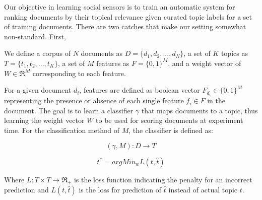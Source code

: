 

Our objective in learning social sensors is to train an automatic
system for ranking documents by their topical relevance given curated
topic labels for a set of training documents.  There are two catches
that make our setting somewhat non-standard.  First, 

We define a corpus of $N$ documents as $D = \{{d_{1}}, {d_{2}}, ..., {d_{N}} \}$, a set of $K$ topics as $T = \{{t_{1}}, {t_{2}}, ..., {t_{K}} \}$, a set of $M$ features as $F = \{0,1\}^{M}$, and a weight vector of $W \in \Re^{M}$ corresponding to each feature. 

For a given document ${d_{i}}$, features are defined as boolean vector ${F_{d_{i}}} \in \{0,1\}^{M}$ representing the presence or absence of each single feature ${f_{i}} \in F$ in the document. The goal is to learn a classifier $\gamma$ that maps documents to a topic, thus learning the weight vector $W$ to be used for scoring documents at experiment time. For the classification method of $M$, the classifier is defined as:

\begin{equation}
(\gamma, M) : D \to T 
\end{equation}

\begin{equation}
t^{*} = argMin_{w} L(t,\hat{t})
\end{equation}

Where ${L : T \times T \to \Re_{+} }$ is the loss function indicating the penalty for an incorrect prediction and ${L(t,\hat{t})}$ is the loss for prediction of ${\hat{t}}$ instead of actual topic $t$.
%
%

